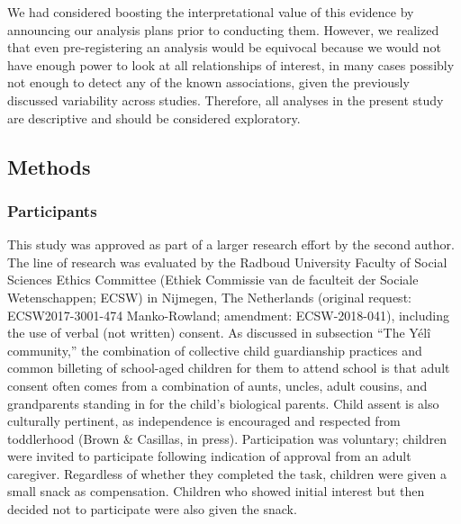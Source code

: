 \documentclass[
  english,
  ,man,floatsintext]{apa6}
\begin{document}
We had considered boosting the interpretational value of this evidence by announcing our analysis plans prior to conducting them. However, we realized that even pre-registering an analysis would be equivocal because we would not have enough power to look at all relationships of interest, in many cases possibly not enough to detect any of the known associations, given the previously discussed variability across studies. Therefore, all analyses in the present study are descriptive and should be considered exploratory.

\hypertarget{methods}{%
\subsection{Methods}\label{methods}}

\hypertarget{participants}{%
\subsubsection{Participants}\label{participants}}

This study was approved as part of a larger research effort by the second author. The line of research was evaluated by the Radboud University Faculty of Social Sciences Ethics Committee (Ethiek Commissie van de faculteit der Sociale Wetenschappen; ECSW) in Nijmegen, The Netherlands (original request: ECSW2017-3001-474 Manko-Rowland; amendment: ECSW-2018-041), including the use of verbal (not written) consent. As discussed in subsection ``The Yélî community,'' the combination of collective child guardianship practices and common billeting of school-aged children for them to attend school is that adult consent often comes from a combination of aunts, uncles, adult cousins, and grandparents standing in for the child's biological parents. Child assent is also culturally pertinent, as independence is encouraged and respected from toddlerhood (Brown \& Casillas, in press). Participation was voluntary; children were invited to participate following indication of approval from an adult caregiver. Regardless of whether they completed the task, children were given a small snack as compensation. Children who showed initial interest but then decided not to participate were also given the snack.
\end{document}
